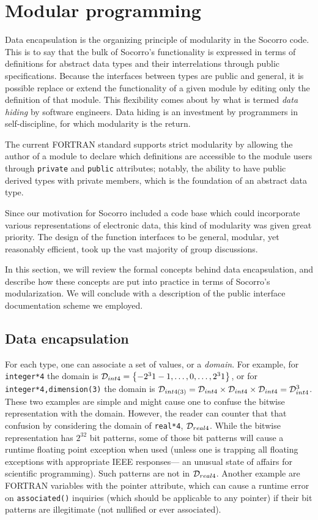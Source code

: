 \section{Modular programming}

Data encapsulation is the organizing principle of modularity in the
Socorro code.  This is to say that the bulk of Socorro's functionality
is expressed in terms of definitions for abstract data types and their
interrelations through public specifications.  Because the
interfaces between types are public and general, it is possible
replace or extend the functionality of a given module by editing only
the definition of that module.  This flexibility comes about by what
is termed {\em data hiding} by software engineers.  Data hiding is an
investment by programmers in self-discipline, for which modularity is the
return.  

The current FORTRAN standard supports strict modularity by allowing
the author of a module to declare which definitions are accessible to
the module users through \verb+private+ and \verb+public+ attributes;
notably, the ability to have public derived types with private
members, which is the foundation of an abstract data type.

Since our motivation for Socorro included a code base which could
incorporate various representations of electronic data, this kind of
modularity was given great priority.  The design of the function
interfaces to be general, modular, yet reasonably efficient, took up
the vast majority of group discussions.

In this section, we will review the formal concepts behind data
encapsulation, and describe how these concepts are put into practice
in terms of Socorro's modularization.  We will conclude with a
description of the public interface documentation scheme we employed.

\subsection{Data encapsulation}

For each type, one can associate a set of values, or a {\em domain}.
For example, for \verb+integer*4+ the domain is ${\cal D}_{int4} =
\left\{-2^31-1,\dots,0,\dots,2^31\right\}$, or for
\verb+integer*4,dimension(3)+ the domain is ${\cal D}_{int4(3)} = 
{\cal D}_{int4} \times
{\cal D}_{int4} \times{\cal D}_{int4}  = {\cal D}_{int4}^3$.
These two examples are simple and might
cause one to confuse the bitwise representation with the domain.
However, the reader can counter that that confusion by considering the
domain of \verb+real*4+, ${\cal D}_{real4}$.  While the bitwise
representation has $2^32$ bit patterns, some of those bit patterns
will cause a runtime floating point exception when used (unless one is
trapping all floating exceptions with appropriate IEEE responses--- an
unusual state of affairs for scientific programming).  Such patterns
are not in ${\cal D}_{real4}$.  Another example are FORTRAN variables
with the pointer attribute, which can cause a runtime error on
\verb+associated()+ inquiries (which should be applicable to any
pointer) if their bit patterns are illegitimate (not nullified or
ever associated).


